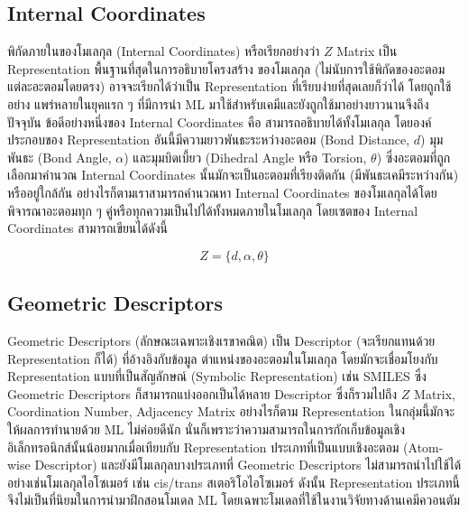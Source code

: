 \subsection{Internal Coordinates}
\label{ssec:internal_coord}

พิกัดภายในของโมเลกุล (Internal Coordinates) หรือเรียกอย่างว่า $Z$ Matrix เป็น Representation พื้นฐานที่สุดในการอธิบายโครงสร้าง%
ของโมเลกุล (ไม่นับการใช้พิกัดของอะตอมแต่ละอะตอมโดยตรง) อาจจะเรียกได้ว่าเป็น Representation ที่เรียบง่ายที่สุดเลยก็ว่าได้ โดยถูกใช้อย่าง%
แพร่หลายในยุคแรก ๆ ที่มีการนำ ML มาใช้สำหรับเคมีและยังถูกใช้มาอย่างยาวนานจึงถึงปัจจุบัน ข้อดีอย่างหนึ่งของ Internal Coordinates คือ%
สามารถอธิบายได้ทั้งโมเลกุล โดยองค์ประกอบของ Representation อันนี้มีความยาวพันธะระหว่างอะตอม (Bond Distance, $d$) มุมพันธะ 
(Bond Angle, $\alpha$) และมุมบิดเบี้ยว (Dihedral Angle หรือ Torsion, $\theta$) ซึ่งอะตอมที่ถูกเลือกมาคำนวณ Internal 
Coordinates นั้นมักจะเป็นอะตอมที่เรียงติดกัน (มีพันธะเคมีระหว่างกัน) หรืออยู่ใกล้กัน อย่างไรก็ตามเราสามารถคำนวณหา Internal 
Coordinates ของโมเลกุลได้โดยพิจารณาอะตอมทุก ๆ คู่หรือทุกความเป็นไปได้ทั้งหมดภายในโมเลกุล โดยเซตของ Internal Coordinates 
สามารถเขียนได้ดังนี้

\begin{equation}\label{eq:internal_coord}
    Z = \{ d, \alpha, \theta \}
\end{equation}

\subsection{Geometric Descriptors}
\label{ssec:geom_descriptor}

Geometric Descriptors (ลักษณะเฉพาะเชิงเรขาคณิต) เป็น Descriptor (จะเรียกแทนด้วย Representation ก็ได้) ที่อ้างอิงกับข้อมูล%
ตำแหน่งของอะตอมในโมเลกุล โดยมักจะเชื่อมโยงกับ Representation แบบที่เป็นสัญลักษณ์ (Symbolic Representation) เช่น SMILES ซึ่ง 
Geometric Descriptors ก็สามารถแบ่งออกเป็นได้หลาย Descriptor ซึ่งก็รวมไปถึง $Z$ Matrix, Coordination Number, Adjacency 
Matrix อย่างไรก็ตาม Representation ในกลุ่มนี้มักจะให้ผลการทำนายด้วย ML ไม่ค่อยดีนัก นั่นก็เพราะว่าความสามารถในการกักเก็บข้อมูลเชิง%
อิเล็กทรอนิกส์นั้นน้อยมากเมื่อเทียบกับ Representation ประเภทที่เป็นแบบเชิงอะตอม (Atom-wise Descriptor) และยังมีโมเลกุลบางประเภทที่ 
Geometric Descriptors ไม่สามารถนำไปใช้ได้ อย่างเช่นโมเลกุลไอโซเมอร์ เช่น cis/trans สเตอริโอไอโซเมอร์ ดังนั้น Representation 
ประเภทนี้จึงไม่เป็นที่นิยมในการนำมาฝึกสอนโมเดล ML โดยเฉพาะโมเดลที่ใช้ในงานวิจัยทางด้านเคมีควอนตัม\autocite{keith2021,musil2021}

